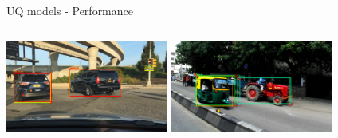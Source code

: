 \documentclass[10pt, aspectratio=169]{beamer}
\begin{document}
\begin{frame}[allowframebreaks]{UQ models - Performance}
    \begin{columns}
        \includegraphics[width=\columnwidth,height=3cm]{images/det_images/bdd_subens_entropies_1.png}
        \includegraphics[width=\columnwidth,height=3cm]{images/det_images/idd_subens_variances_0.png}
    \end{columns}


\end{frame}
\end{document}
